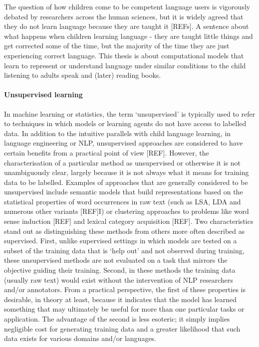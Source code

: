 
The question of how children come to be competent language users is vigorously debated by researchers across the human sciences, but it is widely agreed that they do not learn language because they are taught it [REFs].  A sentence about what happens when children learning language - they are taught little things and get corrected some of the time, but the majority of the time they are just experiencing correct language. This thesis is about computational models that learn to represent or understand language under similar conditions to the child listening to adults speak and (later) reading books.   

\paragraph{Unsupervised learning} In machine learning or statistics, the term `unsupervised' is typically used to refer to techniques in which models or learning agents do not have access to labelled data. In addition to the intuitive parallels with child language learning, in language engineering  or NLP, unsupervised approaches are considered to have certain benefits from a practical point of view [REF]. However, the characterisation of a particular method as unsupervised or otherwise it is not unambiguously clear, largely because it is not always what it means for training data to be labelled. Examples of approaches that are generally considered to be unsupervised include semantic models that build representations based on the statistical properties of word occurrences in raw text (such as LSA, LDA and numerous other variants [REF]I) or clustering approaches to problems like word sense induction [REF] and lexical category acquisition [REF]. Two characteristics stand out as distinguishing these methods from others more often described as supervised. First, unlike supervised settings in which models are tested on a subset of the training data that is `help out' and not observed during training, these unsupervised methods are not evaluated on a task that mirrors the objective guiding their training. Second, in these methods the training data (usually raw text) would exist without the intervention of NLP researchers and/or annotators. From a practical perspective, the first of these properties is desirable, in theory at least, because it indicates that the model has learned something that may ultimately be useful for more than one particular tasks or application. The advantage of the second is less esoteric; it simply implies negligible cost for generating training data and a greater likelihood that such data exists for various domains and/or languages.  


